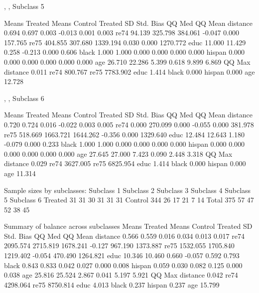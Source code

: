 \documentclass[oneside,letterpaper,titlepage]{article}
\begin{document}
\begin{Schunk}
\begin{Soutput}
, , Subclass 5

         Means Treated Means Control Treated SD Std. Bias    QQ Med   QQ Mean
distance         0.694         0.697      0.003    -0.013     0.001     0.003
re74            94.139       325.798    384.061    -0.047     0.000   157.765
re75           404.855       307.680   1339.194     0.030     0.000  1270.772
educ            11.000        11.429      0.258    -0.213     0.000     0.606
black            1.000         1.000      0.000     0.000     0.000     0.000
hispan           0.000         0.000      0.000     0.000     0.000     0.000
age             26.710        22.286      5.399     0.618     9.899     6.869
            QQ Max
distance     0.011
re74       800.767
re75      7783.902
educ         1.414
black        0.000
hispan       0.000
age         12.728

, , Subclass 6

         Means Treated Means Control Treated SD Std. Bias    QQ Med   QQ Mean
distance         0.720         0.724      0.016    -0.022     0.003     0.005
re74             0.000       270.099      0.000    -0.055     0.000   381.978
re75           518.669      1663.721   1644.262    -0.356     0.000  1329.640
educ            12.484        12.643      1.180    -0.079     0.000     0.233
black            1.000         1.000      0.000     0.000     0.000     0.000
hispan           0.000         0.000      0.000     0.000     0.000     0.000
age             27.645        27.000      7.423     0.090     2.448     3.318
            QQ Max
distance     0.029
re74      3627.005
re75      6825.954
educ         1.414
black        0.000
hispan       0.000
age         11.314


Sample sizes by subclasses:
        Subclass 1 Subclass 2 Subclass 3 Subclass 4 Subclass 5 Subclass 6
Treated         31         31         30         31         31         31
Control        344         26         17         21          7         14
Total          375         57         47         52         38         45

Summary of balance across subclasses
         Means Treated Means Control Treated SD Std. Bias  QQ Med  QQ Mean
distance         0.566         0.559      0.016     0.034   0.013    0.017
re74          2095.574      2715.819   1678.241    -0.127 967.190 1373.887
re75          1532.055      1705.840   1219.402    -0.054 470.490 1264.821
educ            10.346        10.460      0.660    -0.057   0.592    0.793
black            0.843         0.833      0.042     0.027   0.000    0.008
hispan           0.059         0.030      0.082     0.125   0.000    0.038
age             25.816        25.524      2.867     0.041   5.197    5.921
           QQ Max
distance    0.042
re74     4298.064
re75     8750.814
educ        4.013
black       0.237
hispan      0.237
age        15.799


\end{Soutput}
\end{Schunk}
\end{document}
